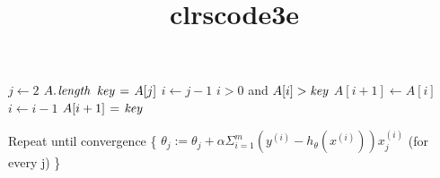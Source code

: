 \documentclass[a4paper]{report}
\date{}
\author{}
\title{clrscode3e}
\begin{document}
\maketitle

\begin{codebox}
\li	\For $j \gets 2$ \To $\attrib{A}{length}$
\li 	\Do
		$\id{key} \gets A[j]$
\li 		$i \gets j-1$
\li 		\While $i > 0$ and $A[i] > \id{key}$
\li 			\Do
				$A[i+1] \gets A[i]$
\li				$i \gets i-1$
			\End
\li 		$A[i+1] \gets \id{key}$
	\End
\end{codebox}

\begin{codebox}
\li	Repeat until convergence \{
\li	\Do
		$\theta_j := \theta_j + \alpha\Sigma_{i=1}^m(y^{(i)} - h_\theta(x^{(i)}))x_j^{(i)}$  (for every j)
	\End
\li	\}
\end{codebox}
\end{document}
